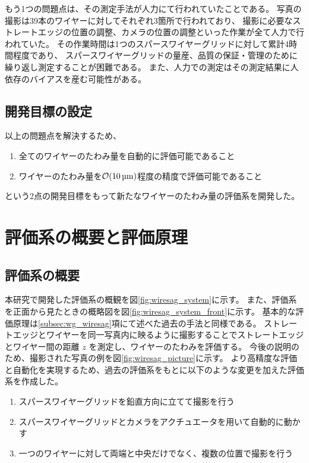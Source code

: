 \documentclass[../../main.tex]{subfiles}
\begin{document}
もう1つの問題点は、その測定手法が人力にて行われていたことである。
写真の撮影は39本のワイヤーに対してそれぞれ3箇所で行われており、
撮影に必要なストレートエッジの位置の調整、カメラの位置の調整といった作業が全て人力で行われていた。
その作業時間は1つのスパースワイヤーグリッドに対して累計4時間程度であり、
スパースワイヤーグリッドの量産、品質の保証・管理のために繰り返し測定することが困難である。
また、人力での測定はその測定結果に人依存のバイアスを産む可能性がある。

\subsection{開発目標の設定}
以上の問題点を解決するため、
\begin{enumerate}
    \item 全てのワイヤーのたわみ量を自動的に評価可能であること
    \item ワイヤーのたわみ量を$\order{\SI{10}{\micro m}}$程度の精度で評価可能であること
\end{enumerate}
という2点の開発目標をもって新たなワイヤーのたわみ量の評価系を開発した。

\section{評価系の概要と評価原理}
\subsection{評価系の概要}
本研究で開発した評価系の概観を図\ref{fig:wiresag_system}に示す。
また、評価系を正面から見たときの概略図を図\ref{fig:wiresag_system_front}に示す。
基本的な評価原理は\ref{subsec:wg_wiresag}項にて述べた過去の手法と同様である。
ストレートエッジとワイヤーを同一写真内に映るように撮影することでストレートエッジとワイヤー間の距離 $z$ を測定し、ワイヤーのたわみを評価する。
今後の説明のため、撮影された写真の例を図\ref{fig:wiresag_picture}に示す。
より高精度な評価と自動化を実現するため、過去の評価系をもとに以下のような変更を加えた評価系を作成した。
\begin{enumerate}
    \item スパースワイヤーグリッドを鉛直方向に立てて撮影を行う
    \item スパースワイヤーグリッドとカメラをアクチュエータを用いて自動的に動かす
    \item 一つのワイヤーに対して両端と中央だけでなく、複数の位置で撮影を行う
\end{enumerate}
\end{document}
